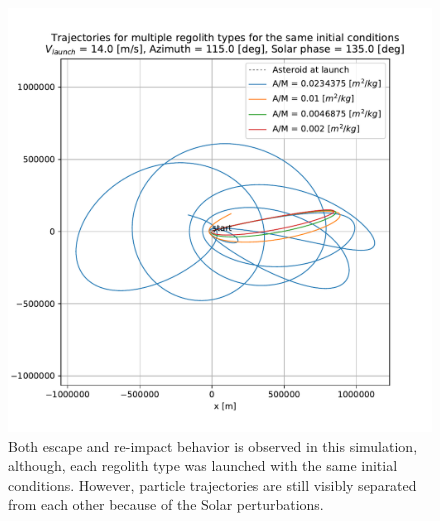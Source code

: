 \FloatBarrier
\begin{figure}[htb]
\centering
\captionsetup{justification=centering}
\includegraphics[width=\textwidth, height=0.5\textheight, keepaspectratio=true]{leading_edge_perturbations/mixedFates_traj_14ms_115Azim_135solarPhase.pdf}
\caption{Both escape and re-impact behavior is observed in this simulation, although, each regolith type was launched with the same initial conditions. However, particle trajectories are still visibly separated from each other because of the Solar perturbations.}
\label{fig:mixed_traj_14ms_115Azim_135solarPhase_leadingEdge}
\end{figure}
\FloatBarrier
